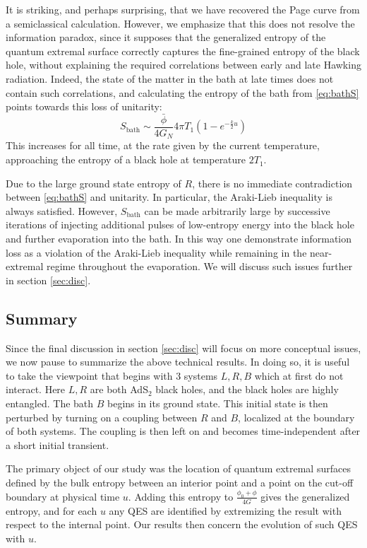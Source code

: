 \documentclass[12pt]{article}
\begin{document}
It is striking, and perhaps surprising, that we have recovered the Page curve from a semiclassical calculation. However, we emphasize that this does not resolve the information paradox, since it supposes that the generalized entropy of the quantum extremal surface correctly captures the fine-grained entropy of the black hole, without explaining the required correlations between early and late Hawking radiation. Indeed, the state of the matter in the bath at late times does not contain such correlations, and calculating the entropy of the bath from \eqref{eq:bathS} points towards this loss of unitarity:
\begin{equation}
\label{eq:Sbath}
	S_\text{bath} \sim \frac{\bar{\phi}}{4G_N}4\pi T_1 (1-e^{-\frac{k}{2}u})
\end{equation}
This increases for all time, at the rate given by the current temperature, approaching the entropy of a black hole at temperature $2T_1$.

Due to the large ground state entropy of $R$, there is no immediate contradiction between \eqref{eq:bathS} and unitarity. In particular, the Araki-Lieb inequality is always satisfied. However, $S_\mathrm{bath}$ can be made arbitrarily large by successive iterations of injecting additional pulses of low-entropy energy into the black hole and further evaporation into the bath. In this way one demonstrate information loss as a violation of the Araki-Lieb inequality while remaining in the near-extremal regime throughout the evaporation. We will discuss such issues further in section \ref{sec:disc}.

\subsection{Summary}
\label{sec:sum}

Since the final discussion in section \ref{sec:disc} will focus on more conceptual issues, we now pause to summarize the above technical results.  In doing so, it is useful to take the viewpoint that begins with 3 systems $L, R, B$ which at first do not interact.  Here $L,R$ are both AdS$_2$ black holes, and the black holes are highly entangled.  The bath $B$ begins in its ground state.  This initial state is then perturbed by turning on a coupling between $R$ and $B$, localized at the boundary of both systems.  The coupling is then left on and becomes time-independent after a short initial transient.

The primary object of our study was the location of quantum extremal surfaces defined by the bulk entropy between an interior point and a point on the cut-off boundary at physical time $u$.  Adding this entropy to $\frac{\phi_0 + \phi}{4G}$ gives the generalized entropy, and for each $u$ any QES are identified by extremizing the result with respect to the internal point.  Our results then concern the evolution of such QES with $u$.
\end{document}

